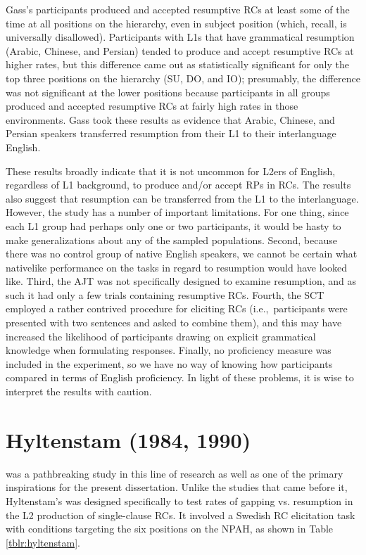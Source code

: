 Gass's participants produced and accepted resumptive RCs at least some of the time at all positions on the hierarchy, even in subject position (which, recall, is universally disallowed). Participants with L1s that have grammatical resumption (Arabic, Chinese, and Persian) tended to produce and accept resumptive RCs at higher rates, but this difference came out as statistically significant for only the top three positions on the hierarchy (SU, DO, and IO); presumably, the difference was not significant at the lower positions because participants in all groups produced and accepted resumptive RCs at fairly high rates in those environments. Gass took these results as evidence that Arabic, Chinese, and Persian speakers transferred resumption from their L1 to their interlanguage English.

These results broadly indicate that it is not uncommon for L2ers of English, regardless of L1 background, to produce and/or accept RPs in RCs. The results also suggest that resumption can be transferred from the L1 to the interlanguage. However, the study has a number of important limitations. For one thing, since each L1 group had perhaps only one or two participants, it would be hasty to make generalizations about any of the sampled populations. Second, because there was no control group of native English speakers, we cannot be certain what nativelike performance on the tasks in regard to resumption would have looked like. Third, the AJT was not specifically designed to examine resumption, and as such it had only a few trials containing resumptive RCs. Fourth, the SCT employed a rather contrived procedure for eliciting RCs (i.e.,~participants were presented with two sentences and asked to combine them), and this may have increased the likelihood of participants drawing on explicit grammatical knowledge when formulating responses. Finally, no proficiency measure was included in the experiment, so we have no way of knowing how participants compared in terms of English proficiency. In light of these problems, it is wise to interpret the results with caution.

\section{Hyltenstam (1984, 1990)}\label{acq-hyltenstam}

\textcite{hyltenstam1984,hyltenstam1990} was a pathbreaking study in this line of research as well as one of the primary inspirations for the present dissertation. Unlike the studies that came before it, Hyltenstam's was designed specifically to test rates of gapping vs. resumption in the L2\footnotemark{} production of single-clause RCs. It involved a Swedish RC elicitation task with conditions targeting the six positions on the NPAH, as shown in Table \ref{tblr:hyltenstam}. 

